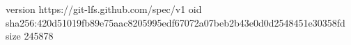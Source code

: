 version https://git-lfs.github.com/spec/v1
oid sha256:420d51019fb89e75aac8205995edf67072a07beb2b43e0d0d2548451e30358fd
size 245878
